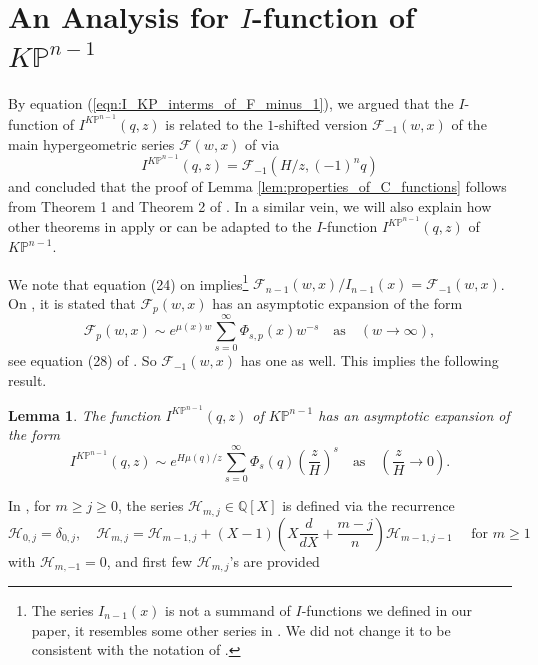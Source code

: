 \documentclass[12pt]{amsart}
\newtheorem{lem}[prop]{Lemma}
\numberwithin{equation}{section}
\newcommand{\KP}{K\mathbb{P}}
\begin{document}



\appendix
\section{An Analysis for \texorpdfstring{$I$}{I}-function of \texorpdfstring{$\KP^{n-1}$}{KP{n-1}}}\label{Appendix:Analysis_of_I_function}
By equation (\ref{eqn:I_KP_interms_of_F_minus_1}), we argued that the $I$-function of $I^{K\mathbb{P}^{n-1}}(q,z)$ is related to the $1$-shifted version $\mathcal{F}_{-1}(w,x)$ of the main hypergeometric series $\mathcal{F}(w,x)$ of \cite{zz} via
\begin{equation*}
I^{K\mathbb{P}^{n-1}}(q,z)=\mathcal{F}_{-1}\left(H/z,(-1)^nq\right)
\end{equation*}
and concluded that the proof of Lemma \ref{lem:properties_of_C_functions} follows from Theorem 1 and Theorem 2 of \cite{zz}. In a similar vein, we will also explain how other theorems in \cite{zz} apply or can be adapted to the $I$-function $I^{K\mathbb{P}^{n-1}}(q,z)$ of $\KP^{n-1}$.

We note that equation (24) on \cite[Page 6]{zz} implies\footnote{The series $I_{n-1}(x)$ is not a summand of $I$-functions we defined in our paper, it resembles some other series in \cite{zz}. We did not change it to be consistent with the notation of \cite{zz}.} $\mathcal{F}_{n-1}(w,x)/I_{n-1}(x)=\mathcal{F}_{-1}(w,x)$. On \cite[Page 8]{zz}, it is stated that $\mathcal{F}_p(w,x)$ has an asymptotic expansion of the form
\begin{equation*}
\mathcal{F}_p(w, x) \sim e^{\mu(x) w} \sum_{s=0}^{\infty} \Phi_{s,p}(x) w^{-s} \quad \text{as} \quad (w \rightarrow \infty),
\end{equation*}
see equation (28) of \cite{zz}. So $\mathcal{F}_{-1}(w,x)$ has one as well. This implies the following result.

\begin{lem}\label{lem:Asymptotics_of_I_function_of_KP}
The function $I^{K\mathbb{P}^{n-1}}(q,z)$ of $\KP^{n-1}$ has an asymptotic expansion of the form
\begin{equation*}
I^{K\mathbb{P}^{n-1}}(q,z) \sim e^{H\mu(q)/z}\sum_{s=0}^{\infty} \Phi_{s}(q) \left(\frac{z}{H}\right)^s \quad \text{as} \quad \left(\frac{z}{H} \rightarrow 0\right).
\end{equation*}
\end{lem}

In \cite{zz}, for $m\geq j \geq 0$, the series $\mathcal{H}_{m, j}\in\mathbb{Q}[X]$ is defined via the recurrence
\begin{equation}\label{eqn:recursion_for_Hmj}
\mathcal{H}_{0, j}=\delta_{0, j}, \quad \mathcal{H}_{m, j}=\mathcal{H}_{m-1, j}+(X-1)\left(X \frac{d}{d X}+\frac{m-j}{n}\right) \mathcal{H}_{m-1, j-1} \quad \text { for } m \geq 1
\end{equation}
with $\mathcal{H}_{m, -1}=0$, and first few $\mathcal{H}_{m, j}$'s are provided
\end{document}
